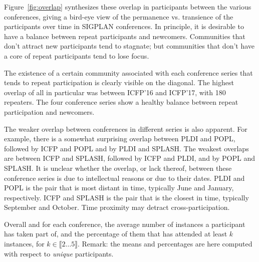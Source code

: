 Figure~\ref{fig:overlap} synthesizes these overlap in participants between the various
conferences, giving a bird-eye view of the permanence vs. transience of the
participants over time in SIGPLAN conferences. 
In principle, it is desirable to
have a balance between repeat participants and newcomers. Communities that don't
attract new participants tend to stagnate; but communities that don't have a
core of repeat participants tend to lose focus.

The existence of a certain community associated with each conference series that
tends to repeat participation is clearly visible on the diagonal. The highest
overlap of all in particular was between ICFP'16 and ICFP'17, with 180
repeaters. The four conference series show a healthy balance between repeat
participation and newcomers.

The weaker overlap between conferences in different series is also apparent.
For example, there is a somewhat surprising overlap between PLDI and
POPL, followed by ICFP and POPL and by PLDI and SPLASH. The weakest overlaps are
between ICFP and SPLASH, followed by ICFP and PLDI, and by POPL and SPLASH. It
is unclear whether the overlap, or lack thereof, between these conference series
is due to intellectual reasons or due to their dates. PLDI and POPL is the pair
that is most distant in time, typically June and January, respectively. ICFP and
SPLASH is the pair that is the closest in time, typically September and October.
Time proximity may detract cross-participation.

\begin{table}
\caption{Overall and for each conference, the average number of instances a
  participant has taken part of, and the percentage of them that has
  attended at least $k$ instances, for $k\in\llbracket 2 \dots 5
  \rrbracket$. Remark: the means and percentages are here computed with
  respect to \emph{unique} participants.  }
\label{table:reccurent}
\end{table}

